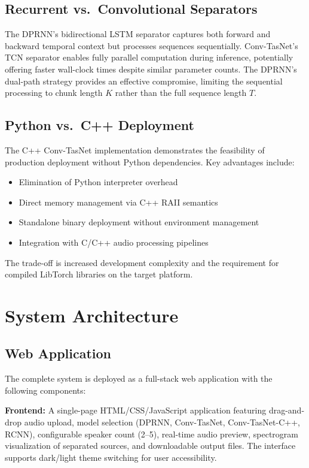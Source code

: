 \documentclass[conference]{IEEEtran}
\begin{document}
\subsection{Recurrent vs.\ Convolutional Separators}

The DPRNN's bidirectional LSTM separator captures both forward and backward temporal context but processes sequences sequentially. Conv-TasNet's TCN separator enables fully parallel computation during inference, potentially offering faster wall-clock times despite similar parameter counts. The DPRNN's dual-path strategy provides an effective compromise, limiting the sequential processing to chunk length $K$ rather than the full sequence length $T$.

\subsection{Python vs.\ C++ Deployment}

The C++ Conv-TasNet implementation demonstrates the feasibility of production deployment without Python dependencies. Key advantages include:
\begin{itemize}[leftmargin=*,nosep]
    \item Elimination of Python interpreter overhead
    \item Direct memory management via C++ RAII semantics
    \item Standalone binary deployment without environment management
    \item Integration with C/C++ audio processing pipelines
\end{itemize}

The trade-off is increased development complexity and the requirement for compiled LibTorch libraries on the target platform.

\section{System Architecture}
\label{sec:system}

\subsection{Web Application}

The complete system is deployed as a full-stack web application with the following components:

\textbf{Frontend:} A single-page HTML/CSS/JavaScript application featuring drag-and-drop audio upload, model selection (DPRNN, Conv-TasNet, Conv-TasNet-C++, RCNN), configurable speaker count (2--5), real-time audio preview, spectrogram visualization of separated sources, and downloadable output files. The interface supports dark/light theme switching for user accessibility.
\end{document}
